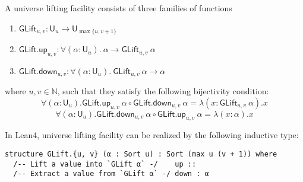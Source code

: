   \begin{definition}
    A universe lifting facility consists of three families of functions
    \begin{enumerate}
      \item $\mathsf{GLift}_{u, v} : \mathsf{U}_u \to \mathsf{U}_{\max\{u, v + 1\}}$
      \item $\mathsf{GLift.up}_{u, v} : \forall (\alpha : \mathsf{U}_u). \ \alpha \to \mathsf{GLift}_{u, v} \ \alpha$
      \item $\mathsf{GLift.down}_{u, v} : \forall (\alpha : \mathsf{U}_u). \ \mathsf{GLift}_{u, v} \ \alpha \to \alpha$
    \end{enumerate}
    where $u, v \in \mathbb{N}$, such that they satisfy the following bijectivity condition:
    $$\forall (\alpha : \mathsf{U}_u). \mathsf{GLift.up}_{u, v} \ \alpha \circ \mathsf{GLift.down}_{u, v} \ \alpha = \lambda (x : \mathsf{GLift}_{u, v} \ \alpha). x$$
    $$\forall (\alpha : \mathsf{U}_u). \mathsf{GLift.down}_{u, v} \ \alpha \circ \mathsf{GLift.up}_{u, v} \ \alpha = \lambda (x : \alpha). x$$
  \end{definition}

  \noindent In Lean4, universe lifting facility can be realized by the following inductive type:
  
  \begin{lstlisting}[style=leanHH]
structure GLift.{u, v} (α : Sort u) : Sort (max u (v + 1)) where
  /-- Lift a value into `GLift α` -/    up ::
  /-- Extract a value from `GLift α` -/ down : α
  \end{lstlisting}

